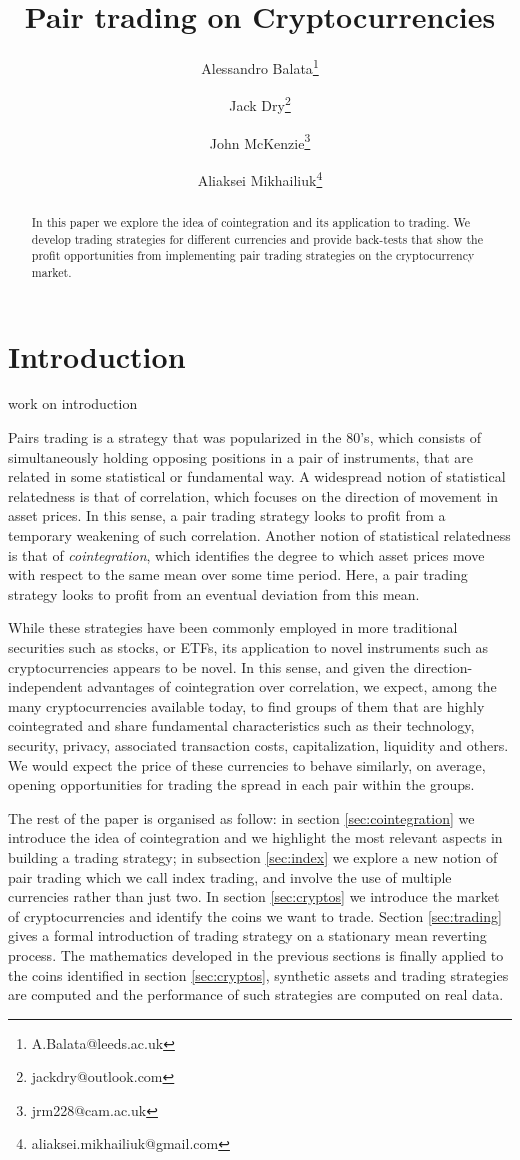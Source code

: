 \documentclass[a4paper,11pt]{article}
\title{Pair trading on Cryptocurrencies}
\author{Alessandro Balata\thanks{A.Balata@leeds.ac.uk} }
\author{Jack Dry\thanks{jack\textunderscore dry@outlook.com}}
\author{John McKenzie\thanks{jrm228@cam.ac.uk}}
\author{Aliaksei Mikhailiuk\thanks{aliaksei.mikhailiuk@gmail.com}}
\affil{The Quant Group - \textit{www.thequantgroup.org} -}
\theoremstyle{remark}
\theoremstyle{plain}
\newcommand\ab[1]{{\color{blue} #1 }}
\begin{document}
\maketitle

\begin{abstract}
In this paper we explore the idea of cointegration and its application to trading. We develop trading strategies for different currencies and provide back-tests that show the profit opportunities from implementing pair trading strategies on the cryptocurrency market.
\end{abstract}

\section{Introduction}

\ab{work on introduction}

Pairs trading is a strategy that was popularized in the 80's, which consists of simultaneously holding opposing positions in a pair of instruments, that are related in some statistical or fundamental way. A widespread notion of statistical relatedness is that of correlation, which focuses on the direction of movement in asset prices. In this sense, a pair trading strategy looks to profit from a temporary weakening of such correlation. Another notion of statistical relatedness is that of \textit{cointegration}, which identifies the degree to which asset prices move with respect to the same mean over some time period. Here, a pair trading strategy looks to profit from an eventual deviation from this mean.

While these strategies have been commonly employed in more traditional securities such as stocks, or ETFs, its application to novel instruments such as cryptocurrencies appears to be novel. In this sense, and given the direction-independent advantages of cointegration over correlation, we expect, among the many cryptocurrencies available today, to find groups of them that are highly cointegrated and share fundamental characteristics such as their technology, security, privacy, associated transaction costs, capitalization, liquidity and others. We would expect the price of these currencies to behave similarly, on average, opening opportunities for trading the spread in each pair within the groups.

The rest of the paper is organised as follow: in section \ref{sec:cointegration} we introduce the idea of cointegration and we highlight the most relevant aspects in building a trading strategy; in subsection \ref{sec:index} we explore a new notion of pair trading which we call index trading, and involve the  use of multiple currencies rather than just two. In section \ref{sec:cryptos} we introduce the market of cryptocurrencies and identify the coins we want to trade. Section \ref{sec:trading} gives a formal introduction of trading strategy on a stationary mean reverting process. The mathematics developed in the previous sections is finally applied to the coins identified in section \ref{sec:cryptos}, synthetic assets and trading strategies are computed and the performance of such strategies are computed on real data. 
\end{document}
